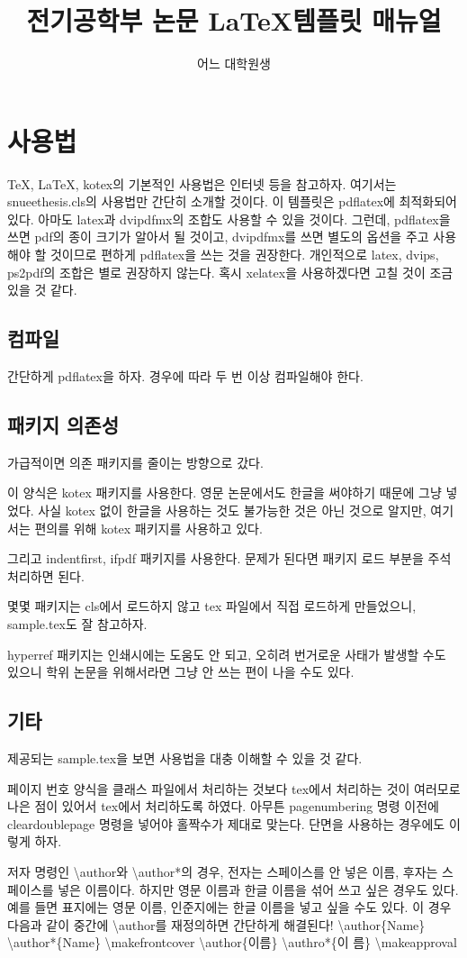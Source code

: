 \documentclass[a4paper]{report}
\title{전기공학부 논문 \LaTeX 템플릿 매뉴얼}
\author{어느 대학원생}
\begin{document}
\tableofcontents

\chapter{사용법}
\TeX, \LaTeX, kotex의 기본적인 사용법은 인터넷 등을 참고하자.
여기서는 snueethesis.cls의 사용법만 간단히 소개할 것이다.
이 템플릿은 pdflatex에 최적화되어 있다.
아마도 latex과 dvipdfmx의 조합도 사용할 수 있을 것이다.
그런데, pdflatex을 쓰면 pdf의 종이 크기가 알아서
될 것이고, dvipdfmx를 쓰면 별도의 옵션을 주고 사용해야 할 것이므로
편하게 pdflatex을 쓰는 것을 권장한다.
개인적으로 latex, dvips, ps2pdf의 조합은 별로 권장하지 않는다.
혹시 xelatex을 사용하겠다면 고칠 것이 조금 있을 것 같다.
\section{컴파일}
간단하게 pdflatex을 하자. 경우에 따라 두 번 이상 컴파일해야 한다.
\section{패키지 의존성}
가급적이면 의존 패키지를 줄이는 방향으로 갔다.

이 양식은 kotex 패키지를 사용한다.
영문 논문에서도 한글을 써야하기 때문에 그냥 넣었다.
사실 kotex 없이 한글을 사용하는 것도 불가능한 것은
아닌 것으로 알지만, 여기서는 편의를 위해 kotex 패키지를 사용하고 있다.

그리고 indentfirst, ifpdf 패키지를 사용한다.
문제가 된다면 패키지 로드 부분을 주석처리하면 된다.

몇몇 패키지는 cls에서 로드하지 않고 tex 파일에서
직접 로드하게 만들었으니, sample.tex도 잘 참고하자.

hyperref 패키지는 인쇄시에는 도움도
안 되고, 오히려 번거로운 사태가 발생할 수도 있으니
학위 논문을 위해서라면 그냥 안 쓰는 편이
나을 수도 있다.
\section{기타}
제공되는 sample.tex을 보면
사용법을 대충 이해할 수 있을 것 같다.

페이지 번호 양식을
클래스 파일에서 처리하는 것보다 tex에서
처리하는 것이 여러모로 나은 점이
있어서 tex에서 처리하도록 하였다.
아무튼 pagenumbering 명령 이전에
cleardoublepage 명령을 넣어야
홀짝수가 제대로 맞는다.
단면을 사용하는 경우에도 이렇게 하자.

저자 명령인 \textbackslash author와 \textbackslash author*의 경우,
전자는 스페이스를 안 넣은 이름, 후자는 스페이스를 넣은 이름이다.
하지만 영문 이름과 한글 이름을 섞어 쓰고 싶은 경우도 있다.
예를 들면 표지에는 영문 이름, 인준지에는 한글 이름을 넣고
싶을 수도 있다.
이 경우 다음과 같이 중간에 \textbackslash author를 재정의하면 간단하게
해결된다!
\textbackslash author\{Name\} \textbackslash author*\{Name\}
\textbackslash makefrontcover
\textbackslash author\{이름\} \textbackslash authro*\{이 름\}
\textbackslash makeapproval
\end{document}
